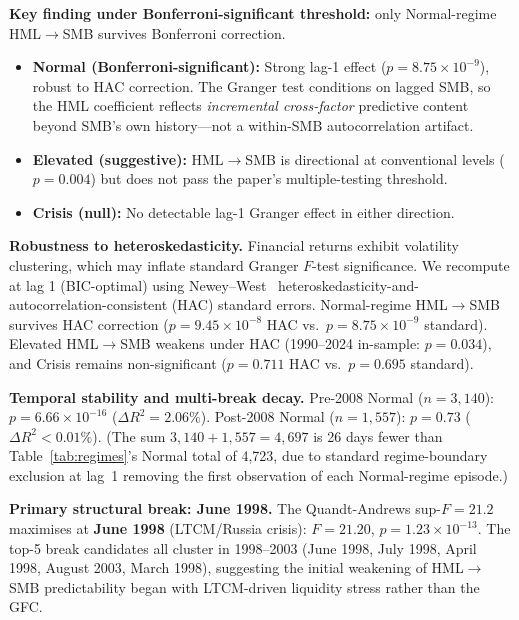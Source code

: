 \documentclass[sigconf,anonymous]{acmart}
\begin{document}
\textbf{Key finding under Bonferroni-significant threshold:} only Normal-regime
HML$\to$SMB survives Bonferroni correction.
\begin{itemize}
    \item \textbf{Normal (Bonferroni-significant):} Strong lag-1 effect
    ($p = 8.75 \times 10^{-9}$), robust to HAC correction. The Granger test conditions
    on lagged SMB, so the HML coefficient reflects \emph{incremental cross-factor}
    predictive content beyond SMB's own history---not a within-SMB autocorrelation artifact.
    \item \textbf{Elevated (suggestive):} HML$\to$SMB is directional at
    conventional levels ($p = 0.004$) but does not pass the paper's
    multiple-testing threshold.
    \item \textbf{Crisis (null):} No detectable lag-1 Granger effect in either
    direction.
\end{itemize}

\textbf{Robustness to heteroskedasticity.}
Financial returns exhibit volatility clustering, which may inflate standard Granger
$F$-test significance. We recompute at lag 1 (BIC-optimal) using Newey--West~\cite{newey1987simple}
heteroskedasticity-and-autocorrelation-consistent (HAC) standard errors.
Normal-regime HML$\to$SMB survives HAC correction
($p = 9.45 \times 10^{-8}$ HAC vs.\ $p = 8.75 \times 10^{-9}$ standard).
Elevated HML$\to$SMB weakens under HAC (1990--2024 in-sample: $p = 0.034$), and Crisis remains
non-significant ($p = 0.711$ HAC vs.\ $p = 0.695$ standard).

\textbf{Temporal stability and multi-break decay.}
Pre-2008 Normal ($n = 3{,}140$): $p = 6.66\times10^{-16}$ ($\Delta R^2 = 2.06\%$).
Post-2008 Normal ($n = 1{,}557$): $p = 0.73$ ($\Delta R^2 < 0.01\%$).
(The sum $3{,}140 + 1{,}557 = 4{,}697$ is 26 days fewer than Table~\ref{tab:regimes}'s
Normal total of 4{,}723, due to standard regime-boundary exclusion at lag~1
removing the first observation of each Normal-regime episode.)

\textbf{Primary structural break: June 1998.}
The Quandt-Andrews sup-$F = 21.2$ maximises at \textbf{June 1998} (LTCM/Russia crisis):
$F = 21.20$, $p = 1.23 \times 10^{-13}$.
The top-5 break candidates all cluster in 1998--2003
(June 1998, July 1998, April 1998, August 2003, March 1998),
suggesting the initial weakening of HML$\to$SMB predictability began with
LTCM-driven liquidity stress rather than the GFC.
\end{document}
